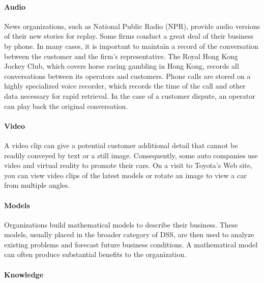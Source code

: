 \documentclass[
]{article}
\begin{document}
\hypertarget{audio}{%
\paragraph*{Audio}\label{audio}}

News organizations, such as National Public Radio (NPR), provide audio
versions of their new stories for replay. Some firms conduct a great
deal of their business by phone. In many cases, it is important to
maintain a record of the conversation between the customer and the
firm's representative. The Royal Hong Kong Jockey Club, which covers
horse racing gambling in Hong Kong, records all conversations between
its operators and customers. Phone calls are stored on a highly
specialized voice recorder, which records the time of the call and other
data necessary for rapid retrieval. In the case of a customer dispute,
an operator can play back the original conversation.

\hypertarget{video}{%
\paragraph*{Video}\label{video}}

A video clip can give a potential customer additional detail that cannot
be readily conveyed by text or a still image. Consequently, some auto
companies use video and virtual reality to promote their cars. On a
visit to Toyota's Web site, you can view video clips of the latest
models or rotate an image to view a car from multiple angles.

\hypertarget{models}{%
\paragraph*{Models}\label{models}}

Organizations build mathematical models to describe their business.
These models, usually placed in the broader category of DSS, are then
used to analyze existing problems and forecast future business
conditions. A mathematical model can often produce substantial benefits
to the organization.

\hypertarget{knowledge}{%
\paragraph*{Knowledge}\label{knowledge}}
\end{document}
